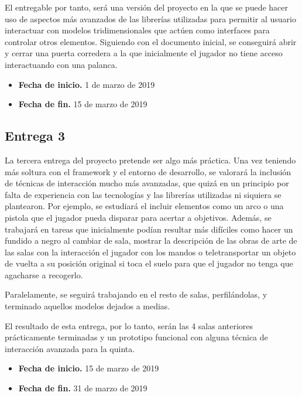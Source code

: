El entregable por tanto, será una versión del proyecto en la que se puede hacer uso de aspectos más avanzados de las librerías utilizadas para permitir al usuario interactuar con modelos tridimensionales que actúen como interfaces para controlar otros elementos. Siguiendo con el documento inicial, se conseguirá abrir y cerrar una puerta corredera a la que inicialmente el jugador no tiene acceso interactuando con una palanca.

\begin{itemize}
    \item \textbf{Fecha de inicio.} 1 de marzo de 2019
    \item \textbf{Fecha de fin.} 15 de marzo de 2019
\end{itemize}

\subsection{Entrega 3}

La tercera entrega del proyecto pretende ser algo más práctica. Una vez teniendo más soltura con el framework y el entorno de desarrollo, se valorará la inclusión de técnicas de interacción mucho más avanzadas, que quizá en un principio por falta de experiencia con las tecnologías y las librerías utilizadas ni siquiera se plantearon. Por ejemplo, se estudiará el incluir elementos como un arco o una pistola que el jugador pueda disparar para acertar a objetivos. Además, se trabajará en tareas que inicialmente podían resultar más difíciles como hacer un fundido a negro al cambiar de sala, mostrar la descripción de las obras de arte de las salas con la interacción el jugador con los mandos o teletransportar un objeto de vuelta a su posición original si toca el suelo para que el jugador no tenga que agacharse a recogerlo.

Paralelamente, se seguirá trabajando en el resto de salas, perfilándolas, y terminado aquellos modelos dejados a medias.

El resultado de esta entrega, por lo tanto, serán las 4 salas anteriores prácticamente terminadas y un prototipo funcional con alguna técnica de interacción avanzada para la quinta.

\begin{itemize}
    \item \textbf{Fecha de inicio.} 15 de marzo de 2019
    \item \textbf{Fecha de fin.} 31 de marzo de 2019
\end{itemize}

